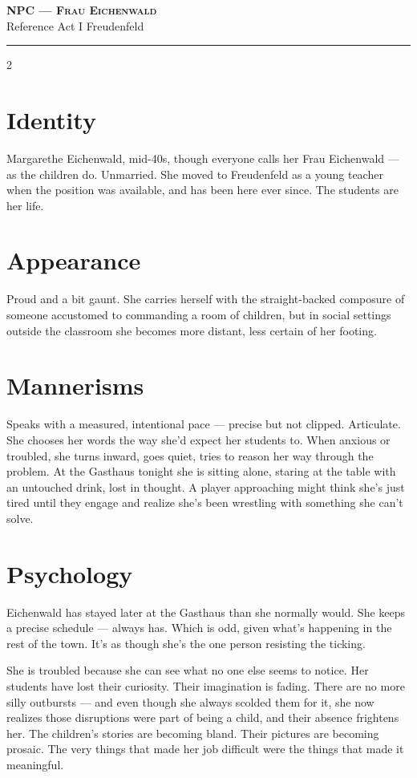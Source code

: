 \documentclass[10pt,letterpaper]{article}
\newcommand{\sceneheader}[4]{%
  \fancyhead[L]{\small\textcolor{accent}{\scshape #1}}%
  \fancyhead[R]{\small\textcolor{accent}{#2 \quad \textbullet \quad #3}}%
  \begin{center}
  {\LARGE\bfseries\scshape\textcolor{accent}{#1}}\\[2pt]
  {\small #2 \quad \textbullet \quad #3 \quad \textbullet \quad #4}\\[2pt]
  \textcolor{rulecol}{\rule{0.5\textwidth}{0.8pt}}
  \end{center}
  \vspace{-4pt}
}
\begin{document}
\newpage


\label{sec:npc-eichenwald}\sceneheader{NPC --- Frau Eichenwald}{Reference}{Act I}{Freudenfeld}

\begin{multicols}{2}

\section*{Identity}
Margarethe Eichenwald, mid-40s, though everyone calls her Frau Eichenwald --- as the children do. Unmarried. She moved to Freudenfeld as a young teacher when the position was available, and has been here ever since. The students are her life.

\section*{Appearance}
Proud and a bit gaunt. She carries herself with the straight-backed composure of someone accustomed to commanding a room of children, but in social settings outside the classroom she becomes more distant, less certain of her footing.

\section*{Mannerisms}
Speaks with a measured, intentional pace --- precise but not clipped. Articulate. She chooses her words the way she'd expect her students to. When anxious or troubled, she turns inward, goes quiet, tries to reason her way through the problem. At the Gasthaus tonight she is sitting alone, staring at the table with an untouched drink, lost in thought. A player approaching might think she's just tired until they engage and realize she's been wrestling with something she can't solve.

\section*{Psychology}
Eichenwald has stayed later at the Gasthaus than she normally would. She keeps a precise schedule --- always has. Which is odd, given what's happening in the rest of the town. It's as though she's the one person resisting the ticking.

She is troubled because she can see what no one else seems to notice. Her students have lost their curiosity. Their imagination is fading. There are no more silly outbursts --- and even though she always scolded them for it, she now realizes those disruptions were part of being a child, and their absence frightens her. The children's stories are becoming bland. Their pictures are becoming prosaic. The very things that made her job difficult were the things that made it meaningful.


\end{multicols}
\end{document}
